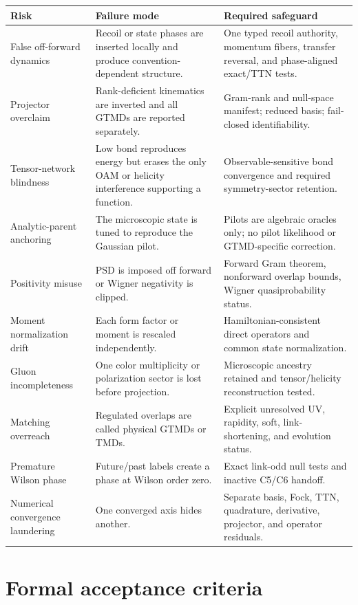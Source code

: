 \documentclass[11pt]{article}
\begin{document}
\begin{longtable}{L{0.24\textwidth}L{0.32\textwidth}L{0.36\textwidth}}
\toprule
Risk & Failure mode & Required safeguard\\
\midrule
\endhead
False off-forward dynamics & Recoil or state phases are inserted locally and
produce convention-dependent structure. & One typed recoil authority,
momentum fibers, transfer reversal, and phase-aligned exact/TTN tests.\\
Projector overclaim & Rank-deficient kinematics are inverted and all GTMDs are
reported separately. & Gram-rank and null-space manifest; reduced basis;
fail-closed identifiability.\\
Tensor-network blindness & Low bond reproduces energy but erases the only OAM
or helicity interference supporting a function. & Observable-sensitive bond
convergence and required symmetry-sector retention.\\
Analytic-parent anchoring & The microscopic state is tuned to reproduce the
Gaussian pilot. & Pilots are algebraic oracles only; no pilot likelihood or
GTMD-specific correction.\\
Positivity misuse & PSD is imposed off forward or Wigner negativity is
clipped. & Forward Gram theorem, nonforward overlap bounds, Wigner
quasiprobability status.\\
Moment normalization drift & Each form factor or moment is rescaled
independently. & Hamiltonian-consistent direct operators and common state
normalization.\\
Gluon incompleteness & One color multiplicity or polarization sector is lost
before projection. & Microscopic ancestry retained and tensor/helicity
reconstruction tested.\\
Matching overreach & Regulated overlaps are called physical GTMDs or TMDs. &
Explicit unresolved UV, rapidity, soft, link-shortening, and evolution status.\\
Premature Wilson phase & Future/past labels create a phase at Wilson order
zero. & Exact link-odd null tests and inactive C5/C6 handoff.\\
Numerical convergence laundering & One converged axis hides another. &
Separate basis, Fock, TTN, quadrature, derivative, projector, and operator
residuals.\\
\bottomrule
\end{longtable}

\section{Formal acceptance criteria}
\label{sec:acceptance}
\end{document}
